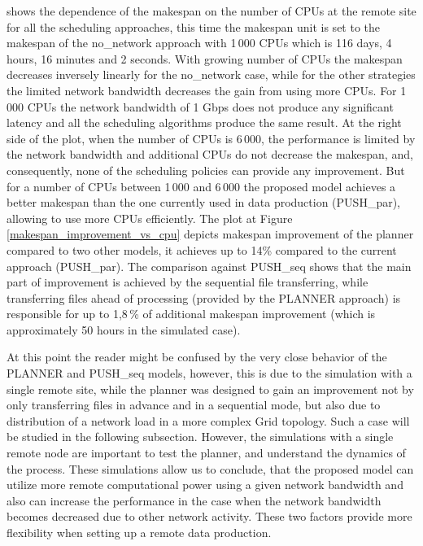 \documentclass{svjour3}                     %
\begin{document}
shows the dependence of the makespan on the number of CPUs at the remote site for all the scheduling approaches, this time the makespan unit is set to  the makespan of the no\_network approach with 1\,000 CPUs which is 116 days, 4 hours, 16 minutes and 2 seconds. With growing number of CPUs the makespan decreases inversely linearly for the no\_network case, while for the other strategies the limited network bandwidth decreases the gain from using more CPUs. For 1\,000 CPUs the network bandwidth of 1 Gbps does not produce any significant latency and all the scheduling algorithms produce the same result. At the right side of the plot, when the number of CPUs is 6\,000, the performance is limited by the network bandwidth and additional CPUs do not decrease the makespan, and, consequently, none of the scheduling policies can provide any improvement. But for a number of CPUs between 1\,000 and 6\,000 the proposed model achieves a better makespan than the one currently used in data production (PUSH\_par), allowing to use more CPUs efficiently. The plot at Figure \ref{makespan_improvement_vs_cpu} depicts makespan improvement of the planner compared to two other models, it achieves up to 14\% compared to the current approach (PUSH\_par). The comparison against PUSH\_seq shows that the main part of improvement is achieved by the sequential file transferring, while transferring files ahead of processing (provided by the PLANNER approach) is responsible for up to 1,8\,\% of additional makespan improvement (which is approximately 50 hours in the simulated case).



At this point the reader might be confused by the very close behavior of the PLANNER and PUSH\_seq models, however, this is due to the simulation with a single remote site, while the planner was designed to gain an improvement not by only  transferring files in advance and in a sequential mode, but also due to distribution of a network load in a more complex Grid topology. Such a case will be studied in the following subsection. However, the simulations with a single remote node are important to test the planner, and understand the dynamics of the process. These simulations allow us to conclude, that the proposed model can utilize more remote computational power using a given network bandwidth and also can increase the performance in the case when the network bandwidth becomes decreased due to other network activity. These two factors provide more flexibility when setting up a remote data production.
\end{document}
